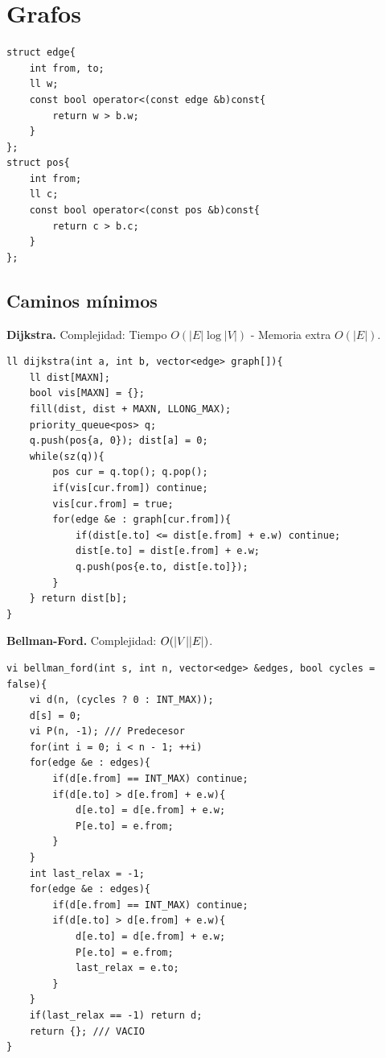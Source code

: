\section{Grafos}
\begin{verbatim}
struct edge{
    int from, to;
    ll w;
    const bool operator<(const edge &b)const{
        return w > b.w;
    }
};
struct pos{
    int from;
    ll c;
    const bool operator<(const pos &b)const{
        return c > b.c;
    }
};
\end{verbatim}



\subsection{Caminos mínimos}
\textbf{Dijkstra.} Complejidad: Tiempo $O(|E| \log |V|)$ - Memoria extra $O(|E|)$.
\begin{verbatim}
ll dijkstra(int a, int b, vector<edge> graph[]){
    ll dist[MAXN];
    bool vis[MAXN] = {};
    fill(dist, dist + MAXN, LLONG_MAX);
    priority_queue<pos> q;
    q.push(pos{a, 0}); dist[a] = 0;
    while(sz(q)){
        pos cur = q.top(); q.pop();
        if(vis[cur.from]) continue;
        vis[cur.from] = true;
        for(edge &e : graph[cur.from]){
            if(dist[e.to] <= dist[e.from] + e.w) continue;
            dist[e.to] = dist[e.from] + e.w;
            q.push(pos{e.to, dist[e.to]});
        }
    } return dist[b];
}
\end{verbatim}



\textbf{Bellman-Ford.} Complejidad: $O(\abs{V}\abs{E})$.
\begin{verbatim}
vi bellman_ford(int s, int n, vector<edge> &edges, bool cycles = false){
    vi d(n, (cycles ? 0 : INT_MAX));
    d[s] = 0;
    vi P(n, -1); /// Predecesor
    for(int i = 0; i < n - 1; ++i)
    for(edge &e : edges){
        if(d[e.from] == INT_MAX) continue;
        if(d[e.to] > d[e.from] + e.w){
            d[e.to] = d[e.from] + e.w;
            P[e.to] = e.from;
        }
    }
    int last_relax = -1;
    for(edge &e : edges){
        if(d[e.from] == INT_MAX) continue;
        if(d[e.to] > d[e.from] + e.w){
            d[e.to] = d[e.from] + e.w;
            P[e.to] = e.from;
            last_relax = e.to;
        }
    }
    if(last_relax == -1) return d;
    return {}; /// VACIO
}
\end{verbatim}



